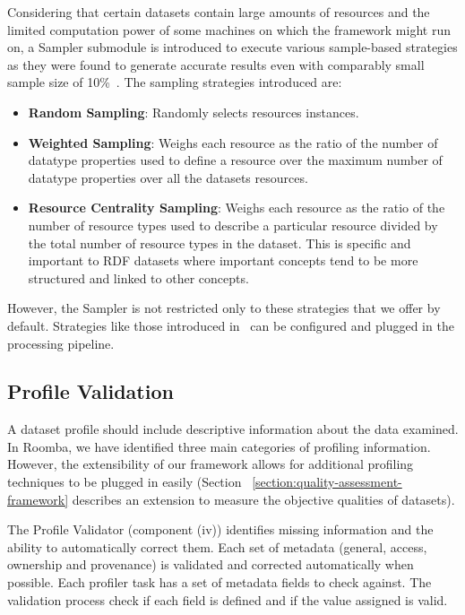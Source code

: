 Considering that certain datasets contain large amounts of resources and the limited computation power of some machines on which the framework might run on, a Sampler submodule is introduced to execute various sample-based strategies as they were found to generate accurate results even with comparably small sample size of 10\%~\cite{Fetahu:ESWC:14}. The sampling strategies introduced are:

\begin{itemize}
  \item \textbf{Random Sampling}: Randomly selects resources instances.
  \item \textbf{Weighted Sampling}: Weighs each resource as the ratio of the number of datatype properties used to define a resource over the maximum number of datatype properties over all the datasets resources.
  \item \textbf{Resource Centrality Sampling}: Weighs each resource as the ratio of the number of resource types used to describe a particular resource divided by the total number of resource types in the dataset. This is specific and important to RDF datasets where important concepts tend to be more structured and linked to other concepts.
\end{itemize}

However, the Sampler is not restricted only to these strategies that we offer by default. Strategies like those introduced in~\cite{Leskovec:KDD:06} can be configured and plugged in the processing pipeline.

\subsection{Profile Validation}
A dataset profile should include descriptive information about the data examined. In Roomba, we have identified three main categories of profiling information. However, the extensibility of our framework allows for additional profiling techniques to be plugged in easily (Section ~\ref{section:quality-assessment-framework} describes an extension to measure the objective qualities of datasets).

The Profile Validator (component (iv)) identifies missing information and the ability to automatically correct them. Each set of metadata (general, access, ownership and provenance) is validated and corrected automatically when possible. Each profiler task has a set of metadata fields to check against. The validation process check if each field is defined and if the value assigned is valid.

